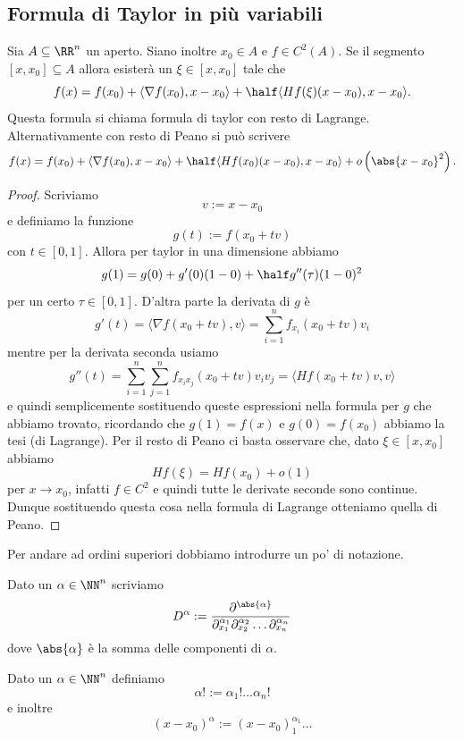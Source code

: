 \documentclass[11pt]{scrartcl}
\begin{document}
	\subsection{Formula di Taylor in più variabili}
	
	\begin{theorem}
		Sia $A\subseteq\RR^n$ un aperto. Siano inoltre $x_0\in A$ e $f\in C^2(A)$. Se il segmento $[x,x_0]\subseteq A$ allora esisterà un $\xi\in [x,x_0]$ tale che
		$$f(x)=f(x_0)+\langle \nabla f(x_0),x-x_0\rangle+\half \langle Hf(\xi)(x-x_0),x-x_0\rangle.$$
		Questa formula si chiama formula di taylor con resto di Lagrange. Alternativamente con resto di Peano si può scrivere
		$$f(x)=f(x_0)+\langle \nabla f(x_0),x-x_0\rangle+\half \langle Hf(x_0)(x-x_0),x-x_0\rangle+o\left(\abs{x-x_0}^2\right).$$
	\end{theorem}
	\begin{proof}
		Scriviamo 
		$$v:=x-x_0$$
		e definiamo la funzione 
		$$g(t):=f(x_0+tv)$$
		con $t\in [0,1]$. Allora per taylor in una dimensione abbiamo
		$$g(1)=g(0)+g'(0)(1-0)+\half g''(\tau)(1-0)^2$$
		per un certo $\tau\in [0,1]$. D'altra parte la derivata di $g$ è
		$$g'(t)=\langle \nabla f (x_0+tv),v\rangle=\sum_{i=1}^n f_{x_i}(x_0+tv)v_i$$
		mentre per la derivata seconda usiamo
		$$g''(t)=\sum_{i=1}^n \sum_{j=1}^n f_{x_ix_j}(x_0+tv)v_iv_j=\langle Hf(x_0+tv)v,v\rangle$$
		e quindi semplicemente sostituendo queste espressioni nella formula per $g$ che abbiamo trovato, ricordando che $g(1)=f(x)$ e $g(0)=f(x_0)$ abbiamo la tesi (di Lagrange). Per il resto di Peano ci basta osservare che, dato $\xi\in [x,x_0]$ abbiamo 
		$$Hf(\xi)=Hf(x_0)+o(1)$$
		per $x\to x_0$, infatti $f\in C^2$ e quindi tutte le derivate seconde sono continue. Dunque sostituendo questa cosa nella formula di Lagrange otteniamo quella di Peano.
	\end{proof}
	Per andare ad ordini superiori dobbiamo introdurre un po' di notazione. 
	\begin{definition}
		Dato un $\alpha\in \NN^n$ scriviamo
		$$D^\alpha := \frac{\partial^{\abs{\alpha}}}{\partial_{x_1}^{\alpha_1}\partial_{x_2}^{\alpha_2}\dots \partial_{x_n}^{\alpha_n}}$$
		dove $\abs{\alpha}$ è la somma delle componenti di $\alpha$. 
	\end{definition}
	\begin{definition}
		Dato un $\alpha\in \NN^n$ definiamo 
		$$\alpha ! := \alpha_1!\dots \alpha_n!$$
		e inoltre
		$$(x-x_0)^\alpha:=\left(x-x_0\right)_1^{\alpha_1}\dots $$
	\end{definition}
\end{document}
